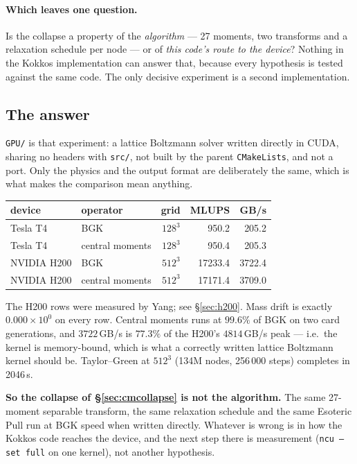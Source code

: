 \documentclass[11pt,a4paper]{article}
\newcommand{\code}[1]{\texttt{\small #1}}
\newcommand{\e}[1]{\times 10^{#1}}
\begin{document}
\paragraph{Which leaves one question.} Is the collapse a property of the
\emph{algorithm} --- 27 moments, two transforms and a relaxation schedule per
node --- or of \emph{this code's route to the device}? Nothing in the Kokkos
implementation can answer that, because every hypothesis is tested against the
same code. The only decisive experiment is a second implementation.

\subsection{The answer}

\code{GPU/} is that experiment: a lattice Boltzmann solver written directly in
CUDA, sharing no headers with \code{src/}, not built by the parent
\code{CMakeLists}, and not a port. Only the physics and the output format are
deliberately the same, which is what makes the comparison mean anything.

\begin{center}\small
\begin{tabular}{llrrr}
\toprule
device & operator & grid & MLUPS & GB/s \\
\midrule
Tesla T4  & BGK             & $128^3$ & 950.2  & 205.2 \\
Tesla T4  & central moments & $128^3$ & 950.4  & 205.3 \\
NVIDIA H200 & BGK             & $512^3$ & 17233.4 & 3722.4 \\
NVIDIA H200 & central moments & $512^3$ & 17171.4 & 3709.0 \\
\bottomrule
\end{tabular}
\end{center}

\noindent The H200 rows were measured by Yang; see \S\ref{sec:h200}. Mass drift
is exactly $0.000\e{0}$ on every row. Central moments runs
at $99.6\%$ of BGK on two card generations, and $3722$\,GB/s is $77.3\%$ of the
H200's $4814$\,GB/s peak --- i.e.\ the kernel is memory-bound, which is what a
correctly written lattice Boltzmann kernel should be. Taylor--Green at $512^3$
(134M nodes, 256\,000 steps) completes in 2046\,s.

\textbf{So the collapse of \S\ref{sec:cmcollapse} is not the algorithm.} The same
27-moment separable transform, the same relaxation schedule and the same Esoteric
Pull run at BGK speed when written directly. Whatever is wrong is in how the
Kokkos code reaches the device, and the next step there is measurement
(\code{ncu --set full} on one kernel), not another hypothesis.
\end{document}
